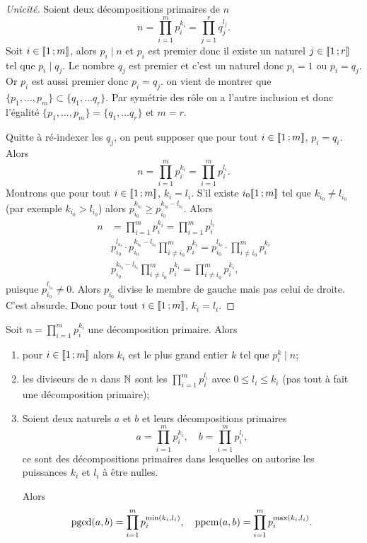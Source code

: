 \begin{proof}[Unicité]
  Soient deux décompositions primaires de $n$
  \begin{equation}
    n=\prod_{i=1}^m p_i^{k_i} = \prod_{j=1}^r q_j^{l_j}.
  \end{equation}
  Soit $i \in \mathopen{\llbracket}1\mathclose{}\mathpunct{};m\mathclose{\rrbracket}$, alors $p_i \mid n$ et $p_i$ est premier donc il existe un naturel $j \in \mathopen{\llbracket}1\mathclose{}\mathpunct{};r\mathclose{\rrbracket}$ tel que $p_i \mid q_j$. Le nombre $q_j$ est premier et c'est un naturel donc $p_i=1$ ou $p_i=q_j$. Or $p_i$ est aussi premier donc $p_i=q_j$. on vient de montrer que $\{p_1, \ldots, p_m\} \subset \{q_1, \ldots q_r\}$. Par symétrie des rôle on a l'autre inclusion et donc l'égalité $\{p_1, \ldots, p_m\} = \{q_1, \ldots q_r\}$ et $m=r$.

  Quitte à ré-indexer les $q_j$, on peut supposer que pour tout $i \in \mathopen{\llbracket}1\mathclose{}\mathpunct{};m\mathclose{\rrbracket}$, $p_i=q_i$. Alors
  \begin{equation}
    n=\prod_{i=1}^m p_i^{k_i} = \prod_{i=1}^m p_i^{l_i}.
  \end{equation}
  Montrons que pour tout $i \in \mathopen{\llbracket}1\mathclose{}\mathpunct{};m\mathclose{\rrbracket}$, $k_i=l_i$. S'il existe $i_0 \mathopen{\llbracket}1\mathclose{}\mathpunct{};m\mathclose{\rrbracket}$ tel que $k_{i_0} \neq l_{i_0}$ (par exemple $k_{i_0} > l_{i_0}$) alors $p_{i_0}^{k_{i_0}} \geq p_{i_0}^{k_{i_0}-l_{i_0}}$. Alors
\begin{align}
    n&=\prod_{i=1}^m p_i^{k_i} = \prod_{i=1}^m p_i^{l_i} \\
    &p_{i_0}^{l_{i_0}} \cdot p_{i_0}^{k_{i_0}-l_{i_0}} \prod_{i \neq i_0}^m p_i^{k_i} = p_{i_0}^{l_{i_0}} \cdot \prod_{i \neq i_0}^m p_i^{k_i}\\
    &p_{i_0}^{k_{i_0}-l_{i_0}} \prod_{i \neq i_0}^m p_i^{k_i} =\prod_{i \neq i_0}^m p_i^{k_i},
  \end{align}
  puisque $p_{i_0}^{l_{i_0}} \neq 0$. Alors $p_{i_0}$ divise le membre de gauche mais pas celui de droite. C'est absurde. Donc pour tout $i \in \mathopen{\llbracket}1\mathclose{}\mathpunct{};m\mathclose{\rrbracket}$,  $k_i=l_i$.
\end{proof}
\begin{corth}
  Soit $n=\prod_{i=1}^m p_i^{k_i}$ une décomposition primaire. Alors
  \begin{enumerate}
  \item pour $i \in \mathopen{\llbracket}1\mathclose{}\mathpunct{};m\mathclose{\rrbracket}$ alors $k_i$ est le plus grand entier $k$ tel que $p_i^k \mid n$;
  \item les diviseurs de $n$ dans $\mathbb{N}$ sont les $\prod_{i=1}^m p_i^{l_i}$ avec $0 \leq l_i \leq k_i$ (pas tout à fait une décomposition primaire);
  \item Soient deux naturels $a$ et $b$ et leurs décompositions primaires
    \begin{equation}
      a=\prod_{i=1}^m p_i^{k_i}, \quad b=\prod_{i=1}^m p_i^{l_i},
    \end{equation}
    ce sont des décompositions primaires dans lesquelles on autorise les puissances $k_i$ et $l_i$ à être nulles. 

    Alors
    \begin{equation}
      \operatorname{pgcd}(a,b) = \prod_{i=1}^m p_i^{\min(k_i,l_i)}, \quad \operatorname{ppcm}(a,b) = \prod_{i=1}^m p_i^{\max(k_i,l_i)}.
    \end{equation}
  \end{enumerate}
\end{corth}
